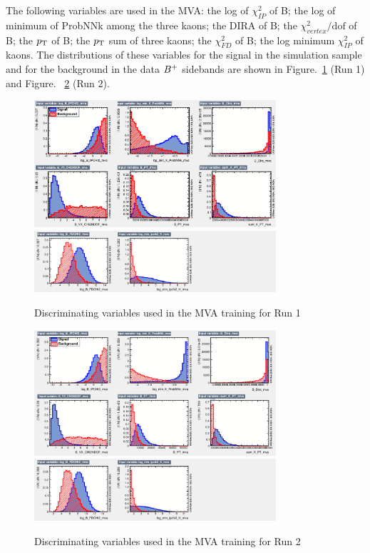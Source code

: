 The following variables are used in the MVA: the log of $\chi^2_{IP}$ of B;
the log of minimum of ProbNNk among the three kaons;
the DIRA of B;
the $\chi^2_{vertex}/\mathrm{dof}$ of B;
the $p_{\mathrm{T}}$ of B;
the $p_{\mathrm{T}}$ sum of three kaons;
the $\chi^2_{FD}$ of B;
the log minimum $\chi^2_{IP}$ of kaons.
The distributions of these variables for the signal in the simulation sample and for the background in the data ${{{B}^+}}$ sidebands are shown in Figure.~\ref{fig:MVAvairables_run1} (Run 1) and Figure. ~\ref{fig:MVAvairables_run2} (Run 2). 


\begin{figure}[!tbp]
\centering
\includegraphics[width=0.8\textwidth]{Figures/03_Zcs/04_Selection/variables_id_c1_run1}
\includegraphics[width=0.8\textwidth]{Figures/03_Zcs/04_Selection/variables_id_c2_run1-1}
\caption{Discriminating variables used in the MVA training for Run 1} 
\label{fig:MVAvairables_run1}
\end{figure}

\begin{figure}[!tbp]
\centering
\includegraphics[width=0.8\textwidth]{Figures/03_Zcs/04_Selection/variables_id_c1_run2}\\
\includegraphics[width=0.8\textwidth]{Figures/03_Zcs/04_Selection/variables_id_c2_run2-1}
\caption{Discriminating variables used in the MVA training for Run 2} 
\label{fig:MVAvairables_run2}
\end{figure}

